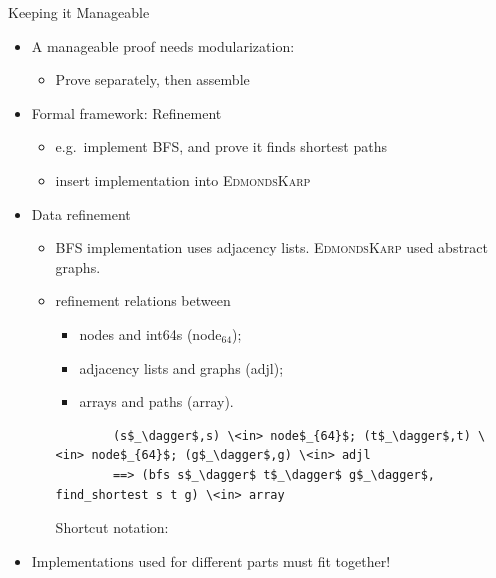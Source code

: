\documentclass[fleqn]{beamer}
\newcommand{\high}[1]{{\color{blue}#1}}
\begin{document}
\begin{frame}[fragile]{Keeping it Manageable}

  \begin{itemize}
   \item<+-> A manageable proof needs modularization:
    \begin{itemize}
     \item<+-> Prove separately, then assemble

    \end{itemize}
   \item<+-> Formal framework: Refinement
    \begin{itemize}
     \item<+-> e.g.\ implement BFS, and prove it finds shortest paths
     \item<+-> insert implementation into \textsc{EdmondsKarp}
    \end{itemize}
   \item<+-> Data refinement
    \begin{itemize}
     \item<+-> BFS implementation uses adjacency lists. \textsc{EdmondsKarp} used abstract graphs.
     \item<+-> refinement relations between
        \begin{itemize}
         \item nodes and int64s (\high{node$_{64}$});
         \item adjacency lists and graphs (\high{adjl});
         \item arrays and paths (\high{array}).
        \end{itemize}
      \onslide<+->
      \begin{lstlisting}
        (s$_\dagger$,s) \<in> node$_{64}$; (t$_\dagger$,t) \<in> node$_{64}$; (g$_\dagger$,g) \<in> adjl
        ==> (bfs s$_\dagger$ t$_\dagger$ g$_\dagger$, find_shortest s t g) \<in> array
      \end{lstlisting}

      \onslide<+->
      Shortcut notation: 
    \end{itemize}
   \item<+-> Implementations used for different parts must fit together!

  \end{itemize}
\end{frame}
\end{document}
